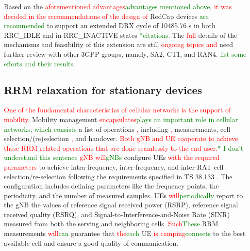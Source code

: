 \documentclass[]{IEEEtran}
\newcommand{\CAREPL}[2]{\textcolor{red}{#1}\textcolor{green}{#2}}
\begin{document}
 Based on the \CAREPL{aforementioned advantages}{advantages mentioned above}, \CAREPL{it was decided in the recommendations of the design of}{} RedCap devices \CAREPL{}{are recommended} to support an extended DRX cycle of 10485.76 s in both RRC\_IDLE and in RRC\_INACTIVE states \CAREPL{}{*citations}. 
 The \CAREPL{full}{} details of the mechanisms and feasibility of this extension are still \CAREPL{ongoing topics and}{} need further review with other 3GPP groups, namely, SA2, CT1, and RAN4. \CAREPL{}{list some efforts and their results.}



\subsection{RRM relaxation for stationary devices}
\label{sec:5-2}



\CAREPL{One of the fundamental characteristics of cellular networks is the support of mobility.}{} 
Mobility management  \CAREPL{encapsulates}{plays an important role in cellular networks, which consists} a list of operations \CAREPL{,}{} including \CAREPL{,}{} measurements, cell selection/(re)selection \CAREPL{,}{} and handover. 
\CAREPL{Both gNB and UE cooperate to achieve these RRM-related operations that are done seamlessly to the end user.}{* I don't understand this sentence} 
\CAREPL{gNB will}{gNBs} configure UEs \CAREPL{with the required parameters}{} to achieve intra-frequency, inter-frequency, and inter-RAT cell selection/re-selection following the requirements specified in TS 38.133 \cite{3gpp_nr_2022-11_38.133}. 
The configuration includes defining parameters like the frequency points, the periodicity, and the number of measured samples. 
UEs \CAREPL{will}{periodically} report to the gNB the values of reference signal received power (RSRP), reference signal received quality (RSRQ), and Signal-to-Interference-and-Noise Rate (SINR) measured from both the serving and neighboring cells. 
\CAREPL{Such}{These} RRM measurements \CAREPL{will}{can} guarantee that \CAREPL{the}{each} UE \CAREPL{is camping}{connects} to the best available cell and ensure a good quality of communication.
\end{document}
